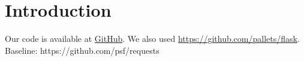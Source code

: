 \documentclass{article}
\begin{document}
\section{Introduction}
Our code is available at \href{https://github.com/numpy/numpy}{GitHub}.
We also used \url{https://github.com/pallets/flask}.
Baseline: https://github.com/psf/requests
\end{document}
